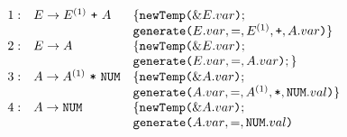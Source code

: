 \documentclass[dvipdfmx]{jarticle}
\begin{document}
$
\begin{array}{lll}
1:& E\rightarrow E^{(1)}\ \texttt{+}\ A & \{\texttt{newTemp(}{\&E.var}\texttt{)};\\
  &                                & \texttt{generate(}{E.var},=,{E^{(1)}},{\texttt{+}},{A.var}\texttt{)}\}\\
2:& E\rightarrow A                 & \{\texttt{newTemp(}{\&E.var}\texttt{)};\\
  &                                & \texttt{generate(}{E.var},=,{A.var}\texttt{)};\}\\
3:& A\rightarrow A^{(1)}\ \texttt{*}\ \texttt{NUM} & \{\texttt{newTemp(}{\&A.var}\texttt{)};\\
  &                                     & \texttt{generate(}{A.var},=,{A^{(1)}},{\texttt{*}},{\texttt{NUM}.val}\texttt{)}\}\\
4:& A\rightarrow \texttt{NUM} & \{\texttt{newTemp(}{\&A.var}\texttt{)};\\
  &                     & \texttt{generate(}{A.var},=,{\texttt{NUM}.val}\texttt{)}
\end{array}$
\end{document}

